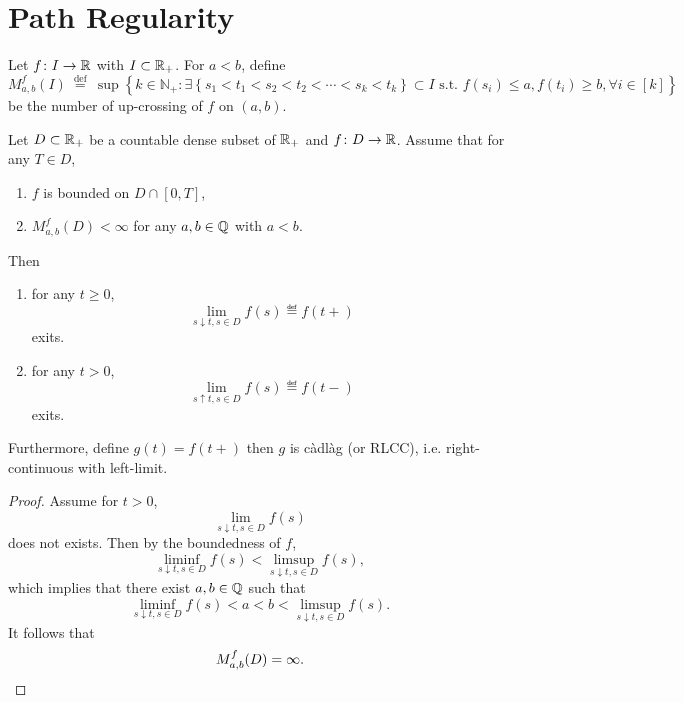 \section{Path Regularity}

\begin{defn}
    Let $f \colon I \rightarrow \mathbb{R}$ with $I \subset \mathbb{R}_+$. For $a < b$, define
    \begin{equation*}
        M_{a, b}^f(I) \stackrel{\text { def }}{=} \sup \left\{k \in \mathbb{N}_{+}: \exists\left\{s_1<t_1<s_2<t_2<\cdots<s_k<t_k\right\} \subset I \text { s.t. } f\left(s_i\right) \leqslant a, f\left(t_i\right) \geqslant b, \forall i \in[k]\right\}
    \end{equation*}
    be the number of up-crossing of $f$ on $(a,b)$.
\end{defn}

\begin{lem}
    Let $D \subset \mathbb{R}_+$ be a countable dense subset of $\mathbb{R}_+$ and $f \colon D \rightarrow \mathbb{R}$. Assume that for any $T \in D$,
    \begin{enumerate}[label=(\roman*)]
        \item $f$ is bounded on $D \cap [0,T]$,
        \item $M_{a,b}^f(D) < \infty$ for any $a,b \in \mathbb{Q}$ with $a < b$.
    \end{enumerate}
    Then
    \begin{enumerate}[label=(\arabic{*})]
        \item for any $t \geq 0$,
        \begin{equation*}
            \lim_{s \downarrow t,s\in D}f(s) \eqdef f(t+)
        \end{equation*}
        exits.
        \item for any $t > 0$,
        \begin{equation*}
            \lim_{s \uparrow t,s\in D}f(s) \eqdef f(t-)
        \end{equation*}
        exits.
    \end{enumerate}
    Furthermore, define $g(t) = f(t+)$ then $g$ is c\`adl\`ag (or RLCC), i.e. right-continuous with left-limit.
\end{lem}
\begin{proof}
    Assume for $t > 0$,
    \begin{equation*}
        \lim_{s \downarrow t,s\in D}f(s)
    \end{equation*}
    does not exists. Then by the boundedness of $f$, 
    \begin{equation*}
        \liminf_{s \downarrow t,s\in D}f(s) <\limsup_{s \downarrow t,s\in D}f(s),
    \end{equation*}
    which implies that there exist $a,b \in \mathbb{Q}$ such that
    \begin{equation*}
        \liminf_{s \downarrow t,s\in D}f(s)< a < b <\limsup_{s \downarrow t,s\in D}f(s).
    \end{equation*}
    It follows that
    \begin{equation*}
        M_{a,b}^f(D) = \infty. \qedhere
    \end{equation*}
\end{proof}

